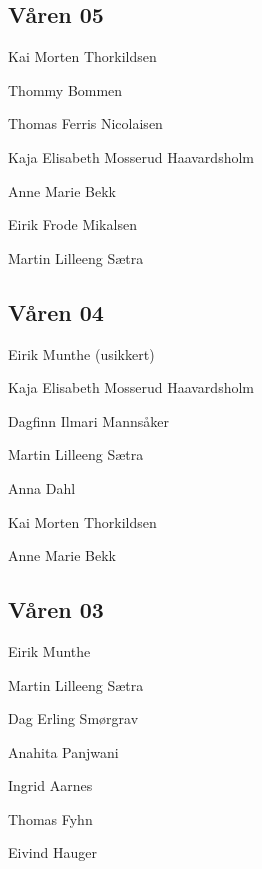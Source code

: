 {\begin{minipage}{0.6\textwidth}
\subsection*{Våren 05}

\begin{description}
	\item[Leder] Kai Morten Thorkildsen
	\item Thommy Bommen
	\item Thomas Ferris Nicolaisen
	\item Kaja Elisabeth Mosserud Haavardsholm
	\item Anne Marie Bekk
	\item Eirik Frode Mikalsen
	\item Martin Lilleeng Sætra
\end{description}
\subsection*{Våren 04}

\begin{description}
	\item[Leder] Eirik Munthe (usikkert)
	\item Kaja Elisabeth Mosserud Haavardsholm
	\item Dagfinn Ilmari Mannsåker
	\item Martin Lilleeng Sætra
	\item Anna Dahl
	\item Kai Morten Thorkildsen
	\item Anne Marie Bekk
\end{description}
\subsection*{Våren 03}

\begin{description}
	\item Eirik Munthe
	\item Martin Lilleeng Sætra
	\item Dag Erling Smørgrav
	\item Anahita Panjwani
	\item Ingrid Aarnes
	\item Thomas Fyhn
	\item Eivind Hauger
\end{description}
\end{minipage}
}
